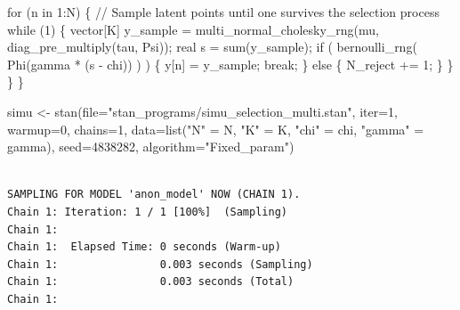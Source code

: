 \documentclass[
  letterpaper,
  DIV=11,
  numbers=noendperiod]{scrartcl}
\newenvironment{Shaded}{\begin{snugshade}}{\end{snugshade}}
\newcommand{\AttributeTok}[1]{\textcolor[rgb]{0.40,0.45,0.13}{#1}}
\newcommand{\CommentTok}[1]{\textcolor[rgb]{0.37,0.37,0.37}{#1}}
\newcommand{\ControlFlowTok}[1]{\textcolor[rgb]{0.00,0.23,0.31}{#1}}
\newcommand{\DataTypeTok}[1]{\textcolor[rgb]{0.68,0.00,0.00}{#1}}
\newcommand{\DecValTok}[1]{\textcolor[rgb]{0.68,0.00,0.00}{#1}}
\newcommand{\FunctionTok}[1]{\textcolor[rgb]{0.28,0.35,0.67}{#1}}
\newcommand{\NormalTok}[1]{\textcolor[rgb]{0.00,0.23,0.31}{#1}}
\newcommand{\OtherTok}[1]{\textcolor[rgb]{0.00,0.23,0.31}{#1}}
\newcommand{\StringTok}[1]{\textcolor[rgb]{0.13,0.47,0.30}{#1}}
\begin{document}
\begin{codelisting}
\begin{Shaded}
\begin{Highlighting}[]
  \ControlFlowTok{for}\NormalTok{ (n }\ControlFlowTok{in} \DecValTok{1}\NormalTok{:N) \{}
    \CommentTok{// Sample latent points until one survives the selection process}
    \ControlFlowTok{while}\NormalTok{ (}\DecValTok{1}\NormalTok{) \{}
      \DataTypeTok{vector}\NormalTok{[K] y\_sample }
\NormalTok{        = multi\_normal\_cholesky\_rng(mu, diag\_pre\_multiply(tau, Psi));}
      \DataTypeTok{real}\NormalTok{ s = sum(y\_sample);}
      \ControlFlowTok{if}\NormalTok{ ( bernoulli\_rng( Phi(gamma * (s {-} chi)) ) ) \{}
\NormalTok{        y[n] = y\_sample;}
        \ControlFlowTok{break}\NormalTok{;}
\NormalTok{      \} }\ControlFlowTok{else}\NormalTok{ \{}
\NormalTok{        N\_reject += }\DecValTok{1}\NormalTok{;}
\NormalTok{      \}}
\NormalTok{    \}}
\NormalTok{  \}}
\NormalTok{\}}
\end{Highlighting}
\end{Shaded}

\end{codelisting}

\begin{Shaded}
\begin{Highlighting}[]
\NormalTok{simu }\OtherTok{\textless{}{-}} \FunctionTok{stan}\NormalTok{(}\AttributeTok{file=}\StringTok{"stan\_programs/simu\_selection\_multi.stan"}\NormalTok{,}
             \AttributeTok{iter=}\DecValTok{1}\NormalTok{, }\AttributeTok{warmup=}\DecValTok{0}\NormalTok{, }\AttributeTok{chains=}\DecValTok{1}\NormalTok{,}
             \AttributeTok{data=}\FunctionTok{list}\NormalTok{(}\StringTok{"N"} \OtherTok{=}\NormalTok{ N, }\StringTok{"K"} \OtherTok{=}\NormalTok{ K, }\StringTok{"chi"} \OtherTok{=}\NormalTok{ chi, }\StringTok{"gamma"} \OtherTok{=}\NormalTok{ gamma),}
             \AttributeTok{seed=}\DecValTok{4838282}\NormalTok{, }\AttributeTok{algorithm=}\StringTok{"Fixed\_param"}\NormalTok{)}
\end{Highlighting}
\end{Shaded}

\begin{verbatim}

SAMPLING FOR MODEL 'anon_model' NOW (CHAIN 1).
Chain 1: Iteration: 1 / 1 [100%]  (Sampling)
Chain 1: 
Chain 1:  Elapsed Time: 0 seconds (Warm-up)
Chain 1:                0.003 seconds (Sampling)
Chain 1:                0.003 seconds (Total)
Chain 1: 
\end{verbatim}
\end{document}
